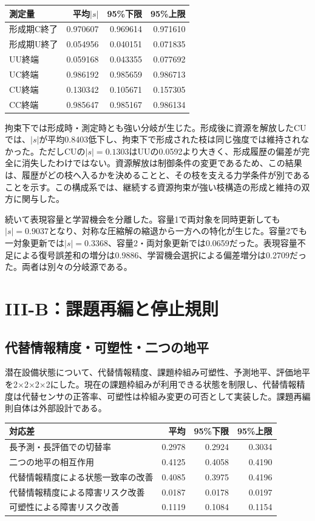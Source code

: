 \documentclass[11pt,a4paper]{ltjsarticle}
\begin{document}
\begin{center}\small
\begin{tabular}{lrrr}
\toprule
測定量 & 平均$|s|$ & 95\%下限 & 95\%上限\\\midrule
形成期C終了 & 0.970607 & 0.969614 & 0.971610\\
形成期U終了 & 0.054956 & 0.040151 & 0.071835\\
UU終端 & 0.059168 & 0.043355 & 0.077692\\
UC終端 & 0.986192 & 0.985659 & 0.986713\\
CU終端 & 0.130342 & 0.105671 & 0.157305\\
CC終端 & 0.985647 & 0.985167 & 0.986134\\\bottomrule
\end{tabular}
\end{center}

拘束下では形成時・測定時とも強い分岐が生じた。形成後に資源を解放したCUでは、$|s|$が平均0.8403低下し、拘束下で形成された枝は同じ強度では維持されなかった。ただしCUの$|s|=0.1303$はUUの0.0592より大きく、形成履歴の偏差が完全に消失したわけではない。資源解放は制御条件の変更であるため、この結果は、履歴がどの枝へ入るかを決めることと、その枝を支える力学条件が別であることを示す。この構成系では、継続する資源拘束が強い枝構造の形成と維持の双方に関与した。

続いて表現容量と学習機会を分離した。容量1で両対象を同時更新しても$|s|=0.9037$となり、対称な圧縮解の縮退から一方への特化が生じた。容量2でも一対象更新では$|s|=0.3368$、容量2・両対象更新では0.0659だった。表現容量不足による復号誤差和の増分は0.9886、学習機会選択による偏差増分は0.2709だった。両者は別々の分岐源である。

\section{III-B：課題再編と停止規則}

\subsection{代替情報精度・可塑性・二つの地平}

潜在設備状態について、代替情報精度、課題枠組み可塑性、予測地平、評価地平を2$\times$2$\times$2$\times$2にした。現在の課題枠組みが利用できる状態を制限し、代替情報精度は代替センサの正答率、可塑性は枠組み変更の可否として実装した。課題再編則自体は外部設計である。

\begin{center}\small
\begin{tabular}{lrrr}
\toprule
対応差 & 平均 & 95\%下限 & 95\%上限\\\midrule
長予測・長評価での切替率 & 0.2978 & 0.2924 & 0.3034\\
二つの地平の相互作用 & 0.4125 & 0.4058 & 0.4190\\
代替情報精度による状態一致率の改善 & 0.4085 & 0.3975 & 0.4196\\
代替情報精度による障害リスク改善 & 0.0187 & 0.0178 & 0.0197\\
可塑性による障害リスク改善 & 0.1119 & 0.1084 & 0.1154\\\bottomrule
\end{tabular}
\end{center}
\end{document}

